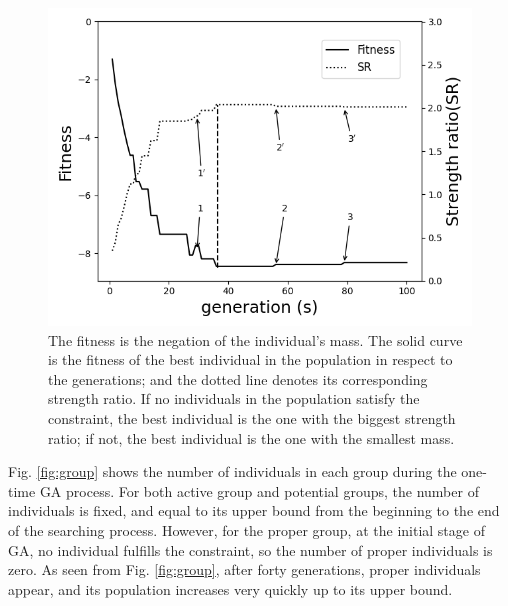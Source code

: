 \begin{figure}[!tb]
	\centering
	\includegraphics[width=\linewidth]{Figures/chapter4/part1/fig/fitness_strength_ratio.png}
	\caption{The fitness is the negation of the individual's mass. The solid
		curve is the fitness of the best individual in the population in respect
		to the generations; and the dotted line denotes its corresponding strength
		ratio. If no individuals in the population satisfy the constraint, the
		best individual is the one with the biggest strength ratio; if not, the
		best individual is the one with the smallest mass.
}
	\label{fig:sr}
\end{figure}



Fig. \ref{fig:group} shows the number of individuals in each group during the
one-time GA process.  For both active group and potential groups, the number of
individuals is fixed, and equal to its upper bound from the beginning to the
end of the searching process. However, for the proper group, at the initial
stage of GA, no individual fulfills the constraint, so the number of proper
individuals is zero. As seen from Fig. \ref{fig:group}, after forty
generations, proper individuals appear, and its population increases very
quickly up to its upper bound.

